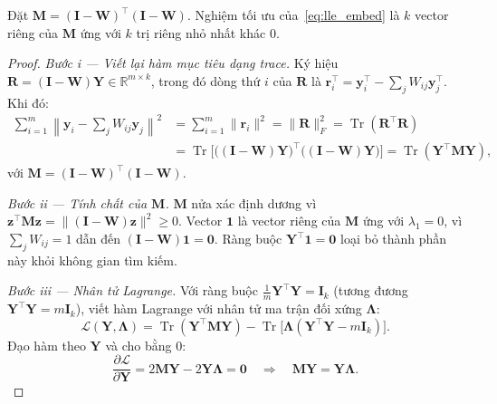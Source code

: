 \begin{theorem}
\label{thm:lle_embed}
Đặt $\mathbf{M}=(\mathbf{I}-\mathbf{W})^\top(\mathbf{I}-\mathbf{W})$.
Nghiệm tối ưu của~\eqref{eq:lle_embed} là $k$ vector riêng của $\mathbf{M}$
ứng với $k$ trị riêng nhỏ nhất khác $0$.
\end{theorem}
\begin{proof}
\textit{Bước i — Viết lại hàm mục tiêu dạng trace.}
Ký hiệu $\mathbf{R}=(\mathbf{I}-\mathbf{W})\mathbf{Y}\in\mathbb{R}^{m\times k}$,
trong đó dòng thứ $i$ của $\mathbf{R}$ là
$\mathbf{r}_i^\top = \mathbf{y}_i^\top - \sum_j W_{ij}\mathbf{y}_j^\top$.
Khi đó:
\begin{align*}
  \sum_{i=1}^m\left\|\mathbf{y}_i - \sum_j W_{ij}\mathbf{y}_j\right\|^2
  &= \sum_{i=1}^m \|\mathbf{r}_i\|^2
   = \|\mathbf{R}\|_F^2
   = \operatorname{Tr}(\mathbf{R}^\top\mathbf{R}) \\
  &= \operatorname{Tr}\!\bigl[
       \bigl((\mathbf{I}-\mathbf{W})\mathbf{Y}\bigr)^\top
       \bigl((\mathbf{I}-\mathbf{W})\mathbf{Y}\bigr)
     \bigr]
   = \operatorname{Tr}(\mathbf{Y}^\top\mathbf{M}\mathbf{Y}),
\end{align*}
với $\mathbf{M}=(\mathbf{I}-\mathbf{W})^\top(\mathbf{I}-\mathbf{W})$.
 
\textit{Bước ii — Tính chất của $\mathbf{M}$.}
$\mathbf{M}$ nửa xác định dương vì
$\mathbf{z}^\top\mathbf{M}\mathbf{z}
=\|(\mathbf{I}-\mathbf{W})\mathbf{z}\|^2\ge 0$.
Vector $\mathbf{1}$ là vector riêng của $\mathbf{M}$ ứng với
$\lambda_1=0$, vì $\sum_j W_{ij}=1$ dẫn đến
$(\mathbf{I}-\mathbf{W})\mathbf{1}=\mathbf{0}$.
Ràng buộc $\mathbf{Y}^\top\mathbf{1}=\mathbf{0}$
loại bỏ thành phần này khỏi không gian tìm kiếm.
 
\textit{Bước iii — Nhân tử Lagrange.}
Với ràng buộc $\frac{1}{m}\mathbf{Y}^\top\mathbf{Y}=\mathbf{I}_k$
(tương đương $\mathbf{Y}^\top\mathbf{Y}=m\mathbf{I}_k$), viết hàm Lagrange
với nhân tử ma trận đối xứng $\boldsymbol{\Lambda}$:
\begin{equation*}
  \mathcal{L}(\mathbf{Y},\boldsymbol{\Lambda})
  = \operatorname{Tr}(\mathbf{Y}^\top\mathbf{M}\mathbf{Y})
  - \operatorname{Tr}\!\bigl[
      \boldsymbol{\Lambda}(\mathbf{Y}^\top\mathbf{Y} - m\mathbf{I}_k)
    \bigr].
\end{equation*}
Đạo hàm theo $\mathbf{Y}$ và cho bằng $0$:
\begin{equation*}
  \frac{\partial\mathcal{L}}{\partial\mathbf{Y}}
  = 2\mathbf{M}\mathbf{Y} - 2\mathbf{Y}\boldsymbol{\Lambda} = \mathbf{0}
  \quad\Longrightarrow\quad
  \mathbf{M}\mathbf{Y} = \mathbf{Y}\boldsymbol{\Lambda}.
\end{equation*}
 

\end{proof}
